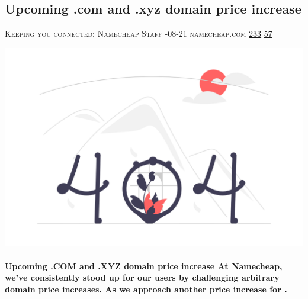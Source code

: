 \documentclass[10pt,a4paper]{article}
\begin{document}
\begin{multicols*}{2}
\begin{minipage}{\linewidth}
\subsection{Upcoming .com and .xyz domain price increase}
\textsc{\footnotesize
{\scriptsize\faUser}\space 
Keeping you connected; Namecheap Staff 
{\scriptsize\faCalendar}-08-21 
{\scriptsize\faGlobe}\space 
namecheap.com 
{\scriptsize\faThumbsOUp}\space 
\href{http://news.ycombinator.com/item?id=37211675\&utm\_term=comment}{233} 
{\scriptsize\faComments}\space 
\href{http://news.ycombinator.com/item?id=37211675\&utm\_term=comment}{57} 
}
\par\medskip\noindent
\href{https://www.namecheap.com/blog/upcoming-com-and-xyz-domain-price-increase/?utm\_source=hackernewsletter\&utm\_medium=email\&utm\_term=startup\_news}{
    \includegraphics[width=0.99\linewidth]{notfound.png}
}
\end{minipage}
\paragraph{}
\textbf{Upcoming .COM and .XYZ domain price increase
At Namecheap, we’ve consistently stood up for our users by challenging arbitrary domain price increases. As we approach another price increase for .}

\end{multicols*}
\end{document}

